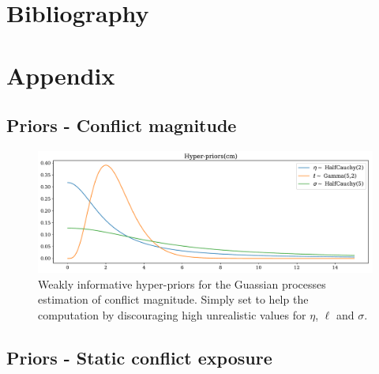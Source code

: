 \documentclass[a4paper]{article}
\begin{document}




\pagebreak

\section{Bibliography}
 


\pagebreak
\section{Appendix}

\subsection{Priors - Conflict magnitude}\label{cmPrior}

\begin{figure}[!htb]
	\centering
	\includegraphics[scale=0.47]{Hyper-priors(cm).pdf}
    \caption{\footnotesize{Weakly informative hyper-priors for the Guassian processes estimation of conflict magnitude. Simply set to help the computation by discouraging high unrealistic values for $\eta$, $\ell$ and $\sigma$.}}\label{roc_curves}
\end{figure}

\subsection{Priors - Static conflict exposure}\label{scePrior}
\end{document}
